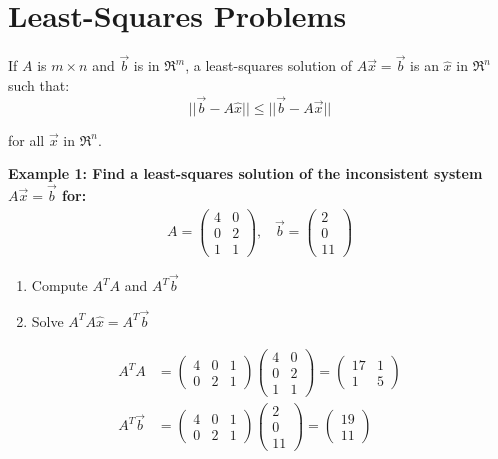 \newline
\section{Least-Squares Problems}
\begin{definition}
    If \(A\) is \(m\times n\) and \(\Vec{b}\) is in \(\Re^m\), a least-squares solution of \(A\Vec{x}= \Vec{b}\) is an \(\hat{x}\) in \(\Re^n\) such that:
    \[||\Vec{b} - A\hat{x}|| \le ||\Vec{b}-A\Vec{x}||\]

    \noindent
    for all \(\Vec{x}\) in \(\Re^n\).
\end{definition}

\noindent
\newline
\textbf{Example 1: Find a least-squares solution of the inconsistent system \(A\Vec{x} = \Vec{b}\) for:}
\begin{align}
    A = \begin{pmatrix}
        4 & 0 \\ 0 & 2 \\ 1 & 1
    \end{pmatrix}, \; \; \;
    \Vec{b} = \begin{pmatrix}
        2 \\ 0 \\ 11
    \end{pmatrix}
\end{align}

\begin{enumerate}
    \item Compute \(A^T A\) and \(A^T \Vec{b}\)
    \item Solve \(A^T A \hat{x}=A^T \Vec{b}\)
\end{enumerate}

\begin{align}
    A^T A &= \begin{pmatrix}
        4 & 0 & 1 \\ 0 & 2 & 1
    \end{pmatrix} \begin{pmatrix}
        4 & 0 \\ 0 & 2 \\ 1 & 1 
    \end{pmatrix} = \begin{pmatrix}
        17 & 1 \\ 1 & 5
    \end{pmatrix} \\
    A^T \Vec{b} &= \begin{pmatrix}
        4 & 0 & 1 \\ 0 & 2 & 1
    \end{pmatrix} \begin{pmatrix}
        2 \\ 0 \\ 11
    \end{pmatrix} = \begin{pmatrix}
        19 \\ 11
    \end{pmatrix}
\end{align}

